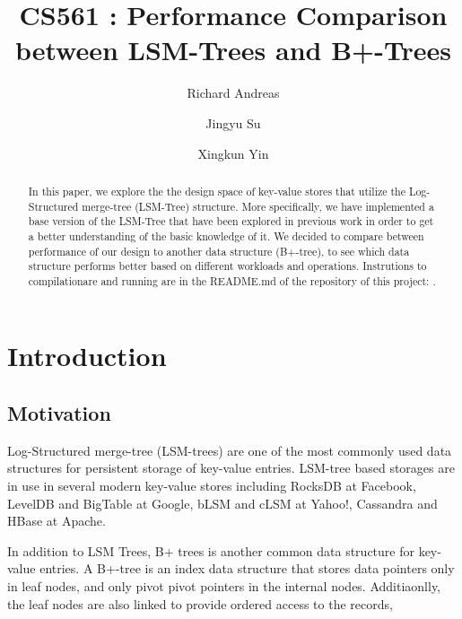 \documentclass[sigconf]{acmart}
\begin{document}
    \title{CS561 : Performance Comparison between LSM-Trees and B+-Trees}

    \author{Richard Andreas}
    \author{Jingyu Su}
    \author{Xingkun Yin}

    \begin{abstract}
        In this paper, we explore the the design space of key-value stores that utilize the Log-Structured merge-tree (LSM-Tree) structure. More specifically, we have implemented a base version of the LSM-Tree that have been explored in previous work in order to get a better understanding of the basic knowledge of it. We decided to compare between performance of our design to another data structure (B+-tree), to see which data structure performs better based on different workloads and operations. Instrutions to compilationare and running are in the README.md of the repository of this project: \href{https://github.com/randreas/LSM_Tree_Repo}{\color{blue}{LSM Tree}}.
    \end{abstract}

    \maketitle

    \section{Introduction}

    \subsection{Motivation}


    Log-Structured merge-tree (LSM-trees) are one of the most commonly used data structures for persistent storage of key-value entries. LSM-tree based storages are in use in several modern key-value stores including RocksDB at
    Facebook, LevelDB and BigTable at Google, bLSM and cLSM at Yahoo!, Cassandra
    and HBase at Apache.

    In addition to LSM Trees, B+ trees is another common data structure for key-value entries. A B+-tree is an index data structure that stores data pointers only in leaf nodes, and only pivot pivot pointers in the internal nodes. Additiaonlly, the leaf nodes are also linked to provide ordered access to the records,
\end{document}
